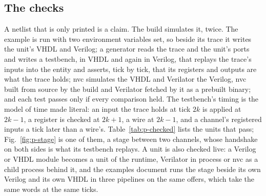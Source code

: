 \documentclass[journal,9pt]{IEEEtran}
\begin{document}


\subsection{The checks}

A netlist that is only printed is a claim. The build simulates it,
twice. The example is run with two environment variables set, so
beside its trace it writes the unit's VHDL and Verilog; a generator
reads the trace and the unit's ports and writes a testbench, in VHDL
and again in Verilog, that replays the trace's inputs into the entity
and asserts, tick by tick, that its registers and outputs are what
the trace holds; nvc simulates the VHDL and Verilator the Verilog,
nvc built from source by the build and Verilator fetched by it as a
prebuilt binary; and each test passes only if
every comparison held. The testbench's timing is the model of time
made literal: an input the trace holds at tick $2k$ is applied at
$2k-1$, a register is checked at $2k+1$, a wire at $2k-1$, and a
channel's registered inputs a tick later than a wire's.
Table~\ref{tab:p-checked} lists the units that pass;
Fig.~\ref{fig:p-stage} is one of them, a stage between two channels,
whose handshake on both sides is what its testbench replays. A unit
is also checked live: a Verilog or VHDL module becomes a unit of the
runtime, Verilator in process or nvc as a child process behind it,
and the examples document runs the stage beside its own Verilog and
its own VHDL in three pipelines on the same offers, which take the
same words at the same ticks.
\end{document}

